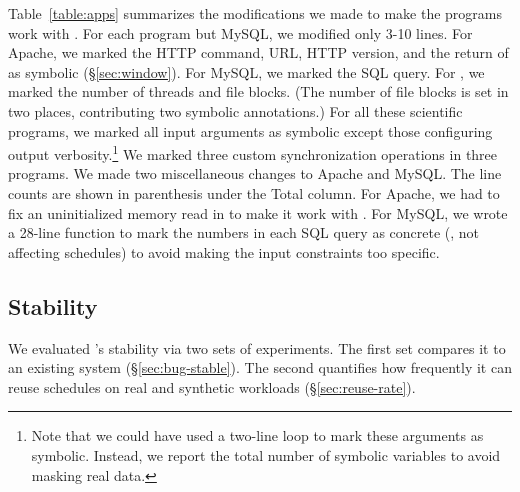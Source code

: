 Table~\ref{table:apps} summarizes the modifications we made to make the
programs work with \tern.  For each program but MySQL, we modified only 3-10
lines.  For Apache, we marked the HTTP command, URL, HTTP version, and the
return of  as symbolic (\S\ref{sec:window}).  For MySQL,
we marked the SQL query.  For \pbzip, we marked the number of threads and
file blocks.  (The number of file blocks is set in two places,
contributing two symbolic annotations.)  For all these scientific programs, we
marked all input arguments as symbolic except those configuring output
verbosity.\footnote{Note that we could have used a two-line loop to mark
  these arguments as symbolic.  Instead, we report the total number of
  symbolic variables to avoid masking real data.}  We marked three custom
synchronization operations in three \splash programs.  We made two
miscellaneous changes to Apache and MySQL.  The line counts are shown in
parenthesis under the Total column.  For Apache, we had to fix an
uninitialized memory read in  to make it work with
\klee.  For MySQL, we wrote a 28-line function to mark the numbers in each
SQL query as concrete (\ie, not affecting schedules) to avoid making the
input constraints too specific.



\subsection{Stability} \label{sec:stability}

We evaluated \tern's stability via two sets of experiments.  The first set
compares it to an existing \dmt system (\S\ref{sec:bug-stable}). The
second quantifies how frequently it can reuse schedules on real and
synthetic workloads (\S\ref{sec:reuse-rate}).

